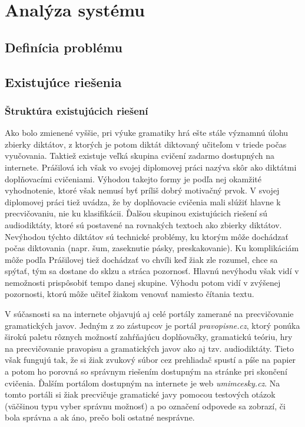 \documentclass[12pt,oneside]{fithesis2}
\begin{document}
    \chapter{Analýza systému}
       \section{Definícia problému}


       \section{Existujúce riešenia}       
       		\subsection{Štruktúra existujúcich riešení}
       				\par Ako bolo zmienené vyššie, pri výuke gramatiky hrá ešte stále významnú úlohu zbierky diktátov, z ktorých je potom diktát diktovaný učiteľom v triede počas vyučovania. Taktiež existuje veľká skupina cvičení zadarmo dostupných na internete. Prášilová\cite{prasilova14} ich však vo svojej diplomovej práci nazýva skôr ako diktátmi doplňovacími cvičeniami. Výhodou takejto formy je podľa nej okamžité vyhodnotenie, ktoré však nemusí byť príliš dobrý motivačný prvok. V svojej diplomovej práci tiež uvádza, že by doplňovacie cvičenia mali slúžiť hlavne k precvičovaniu, nie ku klasifikácii. Ďalšou skupinou existujúcich riešení sú audiodiktáty, ktoré sú postavené na rovnakých textoch ako zbierky diktátov. Nevýhodou týchto diktátov sú technické problémy, ku ktorým môže dochádzať počas diktovania (napr. šum, zaseknutie pásky, preskakovanie). Ku komplikáciám môže podľa Prášilovej tiež dochádzať vo chvíli keď žiak zle rozumel, chce sa spýtať, tým sa dostane do sklzu a stráca pozornosť. Hlavnú nevýhodu však vidí v nemožnosti prispôsobiť tempo danej skupine. Výhodu potom vidí v zvýšenej pozornosti, ktorú môže učiteľ žiakom venovať namiesto čítania textu.
		\par V súčasnosti sa na internete objavujú aj celé portály zamerané na precvičovanie gramatických javov. Jedným z zo zástupcov je portál \textit{pravopisne.cz}, ktorý ponúka širokú paletu rôznych možností zahŕňajúcu doplňovačky, gramatickú teóriu, hry na precvičovanie pravopisu a gramatických javov ako aj tzv. audiodiktáty. Tieto však fungujú tak, že si žiak zvukový súbor cez prehliadač spustí a píše na papier a potom ho porovná so správnym riešením dostupným na stránke pri skončení cvičenia. Ďalším portálom dostupným na internete je web \textit{umimcesky.cz}. Na tomto portáli si žiak precvičuje gramatické javy pomocou testových otázok (väčšinou typu vyber správnu možnosť) a po označení odpovede sa zobrazí, či bola správna a ak áno, prečo boli ostatné nesprávne.
\end{document}
